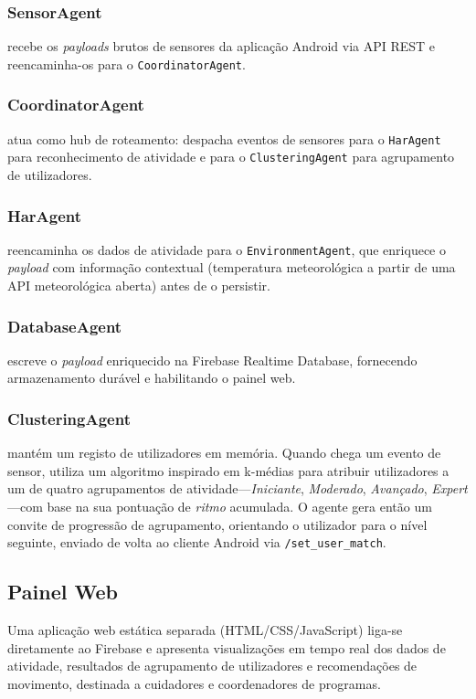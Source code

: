 \documentclass[runningheads]{llncs}
\begin{document}
\subsubsection{SensorAgent} recebe os \emph{payloads} brutos de sensores da
aplicação Android via API REST e reencaminha-os para o \texttt{CoordinatorAgent}.

\subsubsection{CoordinatorAgent} atua como hub de roteamento: despacha eventos de
sensores para o \texttt{HarAgent} para reconhecimento de atividade e para o
\texttt{ClusteringAgent} para agrupamento de utilizadores.

\subsubsection{HarAgent} reencaminha os dados de atividade para o
\texttt{EnvironmentAgent}, que enriquece o \emph{payload} com informação contextual
(temperatura meteorológica a partir de uma API meteorológica aberta) antes de o
persistir.

\subsubsection{DatabaseAgent} escreve o \emph{payload} enriquecido na Firebase
Realtime Database, fornecendo armazenamento durável e habilitando o painel web.

\subsubsection{ClusteringAgent} mantém um registo de utilizadores em memória.
Quando chega um evento de sensor, utiliza um algoritmo inspirado em k-médias para
atribuir utilizadores a um de quatro agrupamentos de atividade---\emph{Iniciante},
\emph{Moderado}, \emph{Avançado}, \emph{Expert}---com base na sua pontuação de
\emph{ritmo} acumulada. O agente gera então um convite de progressão de
agrupamento, orientando o utilizador para o nível seguinte, enviado de volta ao
cliente Android via \texttt{/set\_user\_match}.

\subsection{Painel Web}

Uma aplicação web estática separada (HTML/CSS/JavaScript) liga-se diretamente ao
Firebase e apresenta visualizações em tempo real dos dados de atividade, resultados
de agrupamento de utilizadores e recomendações de movimento, destinada a
cuidadores e coordenadores de programas.
\end{document}
